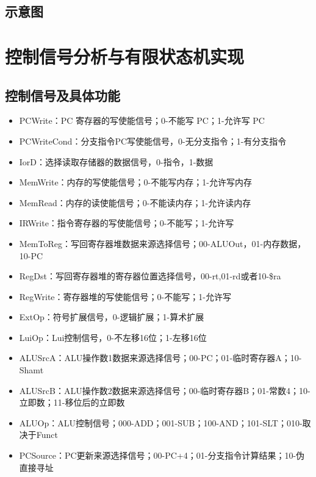 \documentclass{article}
\begin{document}
\subsection{示意图}
\begin{center}

\end{center}

\section{控制信号分析与有限状态机实现}
\subsection{控制信号及具体功能}
\begin{itemize}
    \item PCWrite：PC 寄存器的写使能信号；0-不能写 PC；1-允许写 PC
    \item PCWriteCond：分支指令PC写使能信号，0-无分支指令；1-有分支指令
    \item IorD：选择读取存储器的数据信号，0-指令，1-数据
    \item MemWrite：内存的写使能信号；0-不能写内存；1-允许写内存
    \item MemRead：内存的读使能信号；0-不能读内存；1-允许读内存
    \item IRWrite：指令寄存器的写使能信号；0-不能写；1-允许写
    \item MemToReg：写回寄存器堆数据来源选择信号；00-ALUOut，01-内存数据，10-PC
    \item RegDst：写回寄存器堆的寄存器位置选择信号，00-rt,01-rd或者10-\$ra
    \item RegWrite：寄存器堆的写使能信号；0-不能写；1-允许写
    \item ExtOp：符号扩展信号，0-逻辑扩展；1-算术扩展
    \item LuiOp：Lui控制信号，0-不左移16位；1-左移16位
    \item ALUSrcA：ALU操作数1数据来源选择信号；00-PC；01-临时寄存器A；10-Shamt
    \item ALUSrcB：ALU操作数2数据来源选择信号；00-临时寄存器B；01-常数4；10-立即数；11-移位后的立即数
    \item ALUOp：ALU控制信号；000-ADD；001-SUB；100-AND；101-SLT；010-取决于Funct
    \item PCSource：PC更新来源选择信号；00-PC+4；01-分支指令计算结果；10-伪直接寻址
\end{itemize}
\end{document}
